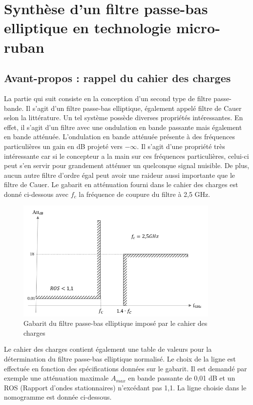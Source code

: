 \documentclass[french]{article}
\begin{document}
\newpage

\section{Synthèse d'un filtre passe-bas elliptique en technologie micro-ruban}

\subsection{Avant-propos : rappel du cahier des charges}

La partie qui suit consiste en la conception d'un second type de filtre passe-bande. Il s'agit d'un filtre passe-bas elliptique, également appelé filtre de Cauer selon la littérature. Un tel système possède diverses propriétés intéressantes. En effet, il s'agit d'un filtre avec une ondulation en bande passante mais également en bande atténuée. L'ondulation en bande atténuée présente à des fréquences particulières un gain en dB projeté vers $-\infty$. Il s'agit d'une propriété très intéressante car si le concepteur a la main sur ces fréquences particulières, celui-ci peut s'en servir pour grandement atténuer un quelconque signal nuisible. De plus, aucun autre filtre d'ordre égal peut avoir une raideur aussi importante que le filtre de Cauer. 
Le gabarit en atténuation fourni dans le cahier des charges est donné ci-dessous avec $f_c$ la fréquence de coupure du filtre à 2,5 GHz.

\begin{figure}[H]
	\centering
	\includegraphics[width=10cm]{../3synthPBas/elliptique/gabarit_passe-bas_elliptique.png}
	\caption{Gabarit du filtre passe-bas elliptique imposé par le cahier des charges}
	\label{fig:gabarit_elliptique}
\end{figure}

Le cahier des charges contient également une table de valeurs pour la détermination du filtre passe-bas elliptique normalisé. Le choix de la ligne est effectuée en fonction des spécifications données sur le gabarit. Il est demandé par exemple une atténuation maximale $A_{max}$ en bande passante de 0,01 dB et un ROS (Rapport d'ondes stationnaires) n'excédant pas 1,1. La ligne choisie dans le nomogramme est donnée ci-dessous.
\end{document}
